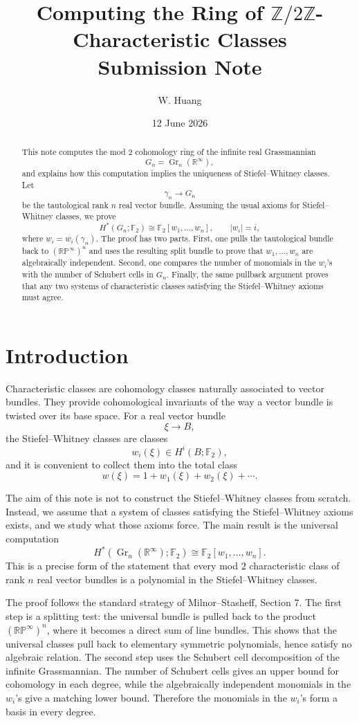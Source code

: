 \documentclass[11pt]{article}
\title{Computing the Ring of $\mathbb Z/2\mathbb Z$-Characteristic Classes\\
\large Submission Note}
\author{W. Huang}
\date{12 June 2026}
\newcommand{\F}{\mathbb F}
\newcommand{\R}{\mathbb R}
\newcommand{\RP}{\mathbb{RP}}
\newcommand{\Gr}{\operatorname{Gr}}
\theoremstyle{plain}
\theoremstyle{definition}
\numberwithin{equation}{section}
\begin{document}
\maketitle

\begin{abstract}
This note computes the mod $2$ cohomology ring of the infinite real Grassmannian
\[
  G_n=\Gr_n(\R^\infty),
\]
and explains how this computation implies the uniqueness of Stiefel--Whitney classes.  Let
\[
  \gamma_n\longrightarrow G_n
\]
be the tautological rank $n$ real vector bundle.  Assuming the usual axioms for Stiefel--Whitney classes, we prove
\[
  H^*(G_n;\F_2)\cong \F_2[w_1,\ldots,w_n],
  \qquad |w_i|=i,
\]
where $w_i=w_i(\gamma_n)$.  The proof has two parts.  First, one pulls the tautological bundle back to $(\RP^\infty)^n$ and uses the resulting split bundle to prove that $w_1,\ldots,w_n$ are algebraically independent.  Second, one compares the number of monomials in the $w_i$'s with the number of Schubert cells in $G_n$.  Finally, the same pullback argument proves that any two systems of characteristic classes satisfying the Stiefel--Whitney axioms must agree.
\end{abstract}

\tableofcontents

\section{Introduction}

Characteristic classes are cohomology classes naturally associated to vector bundles.  They provide cohomological invariants of the way a vector bundle is twisted over its base space.  For a real vector bundle
\[
  \xi\longrightarrow B,
\]
the Stiefel--Whitney classes are classes
\[
  w_i(\xi)\in H^i(B;\F_2),
\]
and it is convenient to collect them into the total class
\[
  w(\xi)=1+w_1(\xi)+w_2(\xi)+\cdots.
\]

The aim of this note is not to construct the Stiefel--Whitney classes from scratch.  Instead, we assume that a system of classes satisfying the Stiefel--Whitney axioms exists, and we study what those axioms force.  The main result is the universal computation
\[
  H^*(\Gr_n(\R^\infty);\F_2)
  \cong
  \F_2[w_1,\ldots,w_n].
\]
This is a precise form of the statement that every mod $2$ characteristic class of rank $n$ real vector bundles is a polynomial in the Stiefel--Whitney classes.

The proof follows the standard strategy of Milnor--Stasheff, Section 7.  The first step is a splitting test: the universal bundle is pulled back to the product $(\RP^\infty)^n$, where it becomes a direct sum of line bundles.  This shows that the universal classes pull back to elementary symmetric polynomials, hence satisfy no algebraic relation.  The second step uses the Schubert cell decomposition of the infinite Grassmannian.  The number of Schubert cells gives an upper bound for cohomology in each degree, while the algebraically independent monomials in the $w_i$'s give a matching lower bound.  Therefore the monomials in the $w_i$'s form a basis in every degree.
\end{document}
